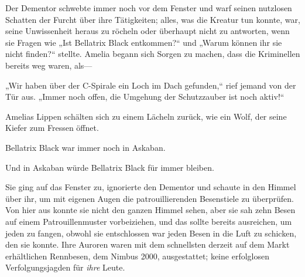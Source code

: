 Der Dementor schwebte immer noch vor dem Fenster und warf seinen nutzlosen Schatten der Furcht über ihre Tätigkeiten; alles, was die Kreatur tun konnte, war, seine Unwissenheit heraus zu röcheln oder überhaupt nicht zu antworten, wenn sie Fragen wie „Ist Bellatrix Black entkommen?“ und „Warum können ihr sie nicht finden?“ stellte. Amelia begann sich Sorgen zu machen, dass die Kriminellen bereits weg waren, als—

„Wir haben über der C-Spirale ein Loch im Dach gefunden,“ rief jemand von der Tür aus. „Immer noch offen, die Umgehung der Schutzzauber ist noch aktiv!“

Amelias Lippen schälten sich zu einem Lächeln zurück, wie ein Wolf, der seine Kiefer zum Fressen öffnet.

Bellatrix Black war immer noch in Askaban.

Und in Askaban würde Bellatrix Black für immer bleiben.

Sie ging auf das Fenster zu, ignorierte den Dementor und schaute in den Himmel über ihr, um mit eigenen Augen die patrouillierenden Besenstiele zu überprüfen. Von hier aus konnte sie nicht den ganzen Himmel sehen, aber sie sah zehn Besen auf einem Patrouillenmuster vorbeiziehen, und das sollte bereits ausreichen, um jeden zu fangen, obwohl sie entschlossen war jeden Besen in die Luft zu schicken, den sie konnte. Ihre Auroren waren mit dem schnellsten derzeit auf dem Markt erhältlichen Rennbesen, dem Nimbus 2000, ausgestattet; keine erfolglosen Verfolgungsjagden für \emph{ihre} Leute.

